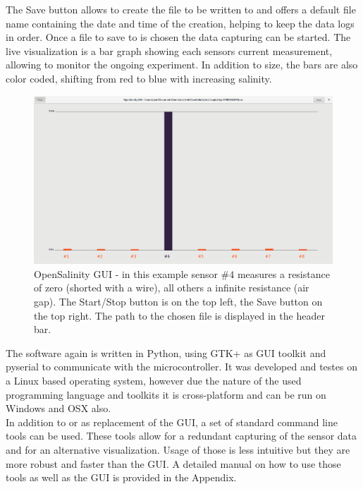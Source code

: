 The Save button allows to create the file to be written to and offers a default file name containing the date and time of the creation, helping to keep the data logs in order. Once a file to save to is chosen the data capturing can be started.
The live visualization is a bar graph showing each sensors current measurement, allowing to monitor the ongoing experiment. In addition to size, the bars are also color coded, shifting from red to blue with increasing salinity.\\

\begin{figure}[H]
	\begin{center}
		\includegraphics[width=\textwidth]{images/UI.png}
		\caption{OpenSalinity GUI - in this example sensor $\#4$ measures a resistance of zero (shorted with a wire), all others a infinite resistance (air gap). The Start/Stop button is on the top left, the Save button on the top right. The path to the chosen file is displayed in the header bar.}
		\label{fig:opamp}
	\end{center}
\end{figure}

The software again is written in Python, using GTK+ as GUI toolkit and pyserial to communicate with the microcontroller. It was developed and testes on a Linux based operating system, however due the nature of the used programming language and toolkits it is cross-platform and can be run on Windows and OSX also.\\

In addition to or as replacement of the GUI, a set of standard command line tools can be used. These tools allow for a redundant capturing of the sensor data and for an alternative visualization. Usage of those is less intuitive but they are more robust and faster than the GUI. A detailed manual on how to use those tools as well as the GUI is provided in the Appendix.

